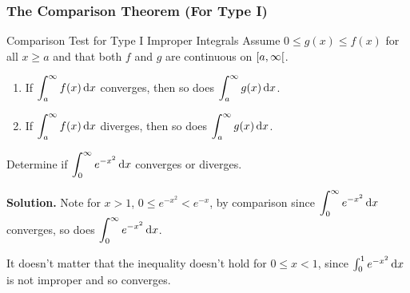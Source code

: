 \subsubsection{The Comparison Theorem (For Type I)}
\begin{Theorem}{Comparison Test for Type I Improper Integrals}{}
    Assume $ 0\leqslant g(x)\leqslant f(x) $ for all $ x\geqslant a $
    and that both $ f $ and $ g $ are continuous on $ \interval[open right]{a}{\infty} $.
    \begin{enumerate}[label=(\arabic*)]
        \item If $ \displaystyle \int_a^{\infty}f(x)\odif{x} $ converges, then so does
              $ \displaystyle \int_a^{\infty}g(x)\odif{x} $.
        \item If $ \displaystyle \int_a^{\infty}f(x)\odif{x} $ diverges, then so does
              $ \displaystyle \int_a^{\infty}g(x)\odif{x} $.
    \end{enumerate}
\end{Theorem}
\begin{Example}{}{}
    Determine if $ \displaystyle \int_0^\infty e^{-x^2}\odif{x} $ converges or diverges.

    \textbf{Solution.} Note for $ x>1 $,
    $ 0\leqslant e^{-x^2} <e^{-x} $, by comparison since
    $ \displaystyle \int_{0}^{\infty} e^{-x^2}\odif{x} $ converges, so does
    $ \displaystyle \int_{0}^{\infty} e^{-x^2}\odif{x} $.
\end{Example}
\begin{Remark}{}{}
    It doesn't matter that the inequality doesn't hold for $ 0\leqslant x<1 $,
    since $ \int_{0}^{1}e^{-x^2} \odif{x} $ is not improper and so converges.
\end{Remark}

